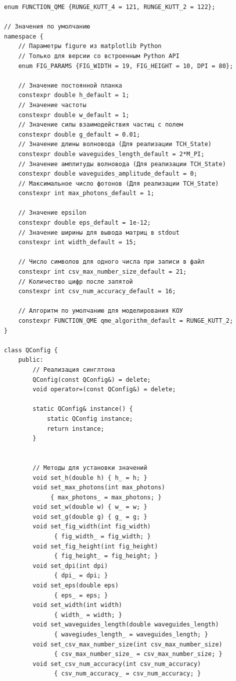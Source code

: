 \documentclass[12pt,fleqn]{article}
\begin{document}
\begin{mdframed}[linecolor=black, topline=true, bottomline=true,
    leftline=false, rightline=false]
\begin{verbatim}  
enum FUNCTION_QME {RUNGE_KUTT_4 = 121, RUNGE_KUTT_2 = 122};

// Значения по умолчанию
namespace {
    // Параметры figure из matplotlib Python
    // Только для версии со встроенным Python API
    enum FIG_PARAMS {FIG_WIDTH = 19, FIG_HEIGHT = 10, DPI = 80};

    // Значение постоянной планка
    constexpr double h_default = 1;
    // Значение частоты
    constexpr double w_default = 1;
    // Значение силы взаимодействия частиц с полем
    constexpr double g_default = 0.01;
    // Значение длины волновода (Для реализации TCH_State)
    constexpr double waveguides_length_default = 2*M_PI;
    // Значение амплитуды волновода (Для реализации TCH_State)
    constexpr double waveguides_amplitude_default = 0;
    // Максимальное число фотонов (Для реализации TCH_State)
    constexpr int max_photons_default = 1;

    // Значение epsilon
    constexpr double eps_default = 1e-12;
    // Значение ширины для вывода матриц в stdout
    constexpr int width_default = 15;

    // Число символов для одного числа при записи в файл
    constexpr int csv_max_number_size_default = 21;
    // Количество цифр после запятой
    constexpr int csv_num_accuracy_default = 16;

    // Алгоритм по умолчанию для моделирования КОУ
    constexpr FUNCTION_QME qme_algorithm_default = RUNGE_KUTT_2;
}

class QConfig {
    public:
        // Реализация синглтона
        QConfig(const QConfig&) = delete;
        void operator=(const QConfig&) = delete;

        static QConfig& instance() {
            static QConfig instance;
            return instance;
        }

        
        // Методы для установки значений 
        void set_h(double h) { h_ = h; }
        void set_max_photons(int max_photons) 
             { max_photons_ = max_photons; }
        void set_w(double w) { w_ = w; }
        void set_g(double g) { g_ = g; }
        void set_fig_width(int fig_width) 
              { fig_width_ = fig_width; }
        void set_fig_height(int fig_height)
              { fig_height_ = fig_height; }
        void set_dpi(int dpi)
              { dpi_ = dpi; }
        void set_eps(double eps)
              { eps_ = eps; }
        void set_width(int width)
              { width_ = width; }
        void set_waveguides_length(double waveguides_length)
              { wavegiudes_length_ = waveguides_length; }
        void set_csv_max_number_size(int csv_max_number_size)
              { csv_max_number_size_ = csv_max_number_size; }
        void set_csv_num_accuracy(int csv_num_accuracy)
              { csv_num_accuracy_ = csv_num_accuracy; }


\end{verbatim}
\end{mdframed}
\end{document}
